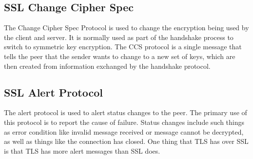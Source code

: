 \documentclass{article}
\begin{document}
\subsection{SSL Change Cipher Spec}
The Change Cipher Spec Protocol is used to change the encryption being used by the client and server. 
It is normally used as part of the handshake process to switch to symmetric key encryption. 
The CCS protocol is a single message that tells the peer that the sender wants to change to a new set of keys, 
which are then created from information exchanged by the handshake protocol.
\subsection{SSL Alert Protocol}
The alert protocol is used to alert status changes to the peer. The primary use of this protocol is to report the cause of failure. 
Status changes include such things as error condition like invalid message received or message cannot be decrypted, as well as things 
like the connection has closed. One thing that TLS has over SSL is that TLS has more alert messages than SSL does.
\end{document}

